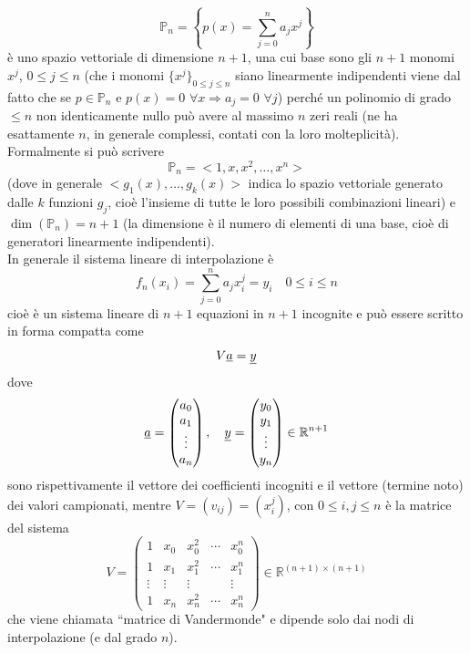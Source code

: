 \documentclass[12pt,headings=optiontohead]{article}
\begin{document}
\[ \mathbb{P}_n = \left\{p(x) = \sum_{j=0}^n a_j x^j \right\} \]
è uno spazio vettoriale di dimensione $n+1$, una cui base sono gli $n+1$ monomi $x^j$, $0 \leq j \leq n$ (che i monomi $\{ x^j \}_{0 \leq j \leq n}$ siano linearmente indipendenti viene dal fatto che se $p \in \mathbb{P}_n$ e $p(x) = 0$ $\forall x \Rightarrow a_j = 0$ $\forall j$) perché un polinomio di grado $\leq n$ non identicamente nullo può avere al massimo $n$ zeri reali (ne ha esattamente $n$, in generale complessi, contati con la loro molteplicità).\\
Formalmente si può scrivere
\[ \mathbb{P}_n = < 1, x, x^2, \dotso, x^n > \]
(dove in generale $< g_1(x), \dotso, g_k(x) >$ indica lo spazio vettoriale generato dalle $k$ funzioni $g_j$, cioè l'insieme di tutte le loro possibili combinazioni lineari) e $\dim(\mathbb{P}_n) = n+1$ (la dimensione è il numero di elementi di una base, cioè di generatori linearmente indipendenti).\\
In generale il sistema lineare di interpolazione è
\[ f_n(x_i) = \sum_{j=0}^n a_j x_i^j = y_i \quad 0 \le i \le n \]
cioè è un sistema lineare di $n+1$ equazioni in $n+1$ incognite e può essere scritto in forma compatta come
\[ V\uline{a} = \uline{y} \]
dove
\[ \uline{a} = 
    \begin{pmatrix}
    a_0 \\ a_1 \\ \vdots \\ a_n
    \end{pmatrix}, \quad
\uline{y} =
    \begin{pmatrix}
    y_0 \\ y_1 \\ \vdots \\ y_n
    \end{pmatrix}
    \in \mathbb{R}^{n+1} \]
sono rispettivamente il vettore dei coefficienti incogniti e il vettore (termine noto) dei valori campionati, mentre $V = (v_{ij}) = (x_i^j)$, con $0 \leq i,j \leq n$ è la matrice del sistema
\[ V =
    \begin{pmatrix}
    1 & x_0 & x_0^2 & \cdots & x_0^n \\
    1 & x_1 & x_1^2 & \cdots & x_1^n \\
    \vdots & \vdots & \vdots & \ & \vdots \\
    1 & x_n & x_n^2 & \cdots & x_n^n
    \end{pmatrix}
    \in \mathbb{R}^{(n+1) \times (n+1)} \]
che viene chiamata ``matrice di Vandermonde" e dipende solo dai nodi di interpolazione (e dal grado $n$).\\
\end{document}
